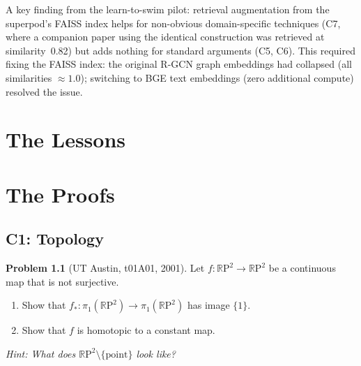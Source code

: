 \documentclass[12pt,oneside]{book}
\theoremstyle{plain}
\theoremstyle{definition}
\newtheorem{problem}{Problem}[chapter]
\theoremstyle{remark}
\newcommand{\RP}{\mathbb{R}\mathrm{P}}
\begin{document}
A key finding from the learn-to-swim pilot: retrieval augmentation
from the superpod's FAISS index helps for non-obvious domain-specific
techniques (C7, where a companion paper using the identical
construction was retrieved at similarity~0.82) but adds nothing for
standard arguments (C5, C6). This required fixing the FAISS index:
the original R-GCN graph embeddings had collapsed (all similarities
$\approx 1.0$); switching to BGE text embeddings (zero additional
compute) resolved the issue.

\part{The Lessons}


\part{The Proofs}

\chapter{C1: Topology}\label{ch:c1}

\begin{problem}[UT Austin, t01A01, 2001]
Let $f : \RP^2 \to \RP^2$ be a continuous map that is not surjective.
\begin{enumerate}[label=(\alph*)]
\item Show that $f_* : \pi_1(\RP^2) \to \pi_1(\RP^2)$ has image $\{1\}$.
\item Show that $f$ is homotopic to a constant map.
\end{enumerate}
\emph{Hint: What does $\RP^2 \setminus \{\mathrm{point}\}$ look like?}
\end{problem}
\end{document}
